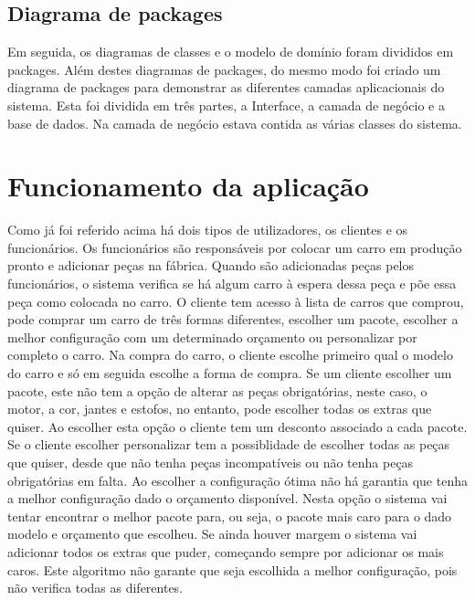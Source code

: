 \documentclass[10pt, a4paper]{article}
\begin{document}
\subsection{Diagrama de packages}
Em seguida, os diagramas de classes e o modelo de domínio foram divididos em packages. Além destes diagramas de packages, do mesmo modo foi criado um diagrama de packages para demonstrar as diferentes camadas aplicacionais do sistema. Esta foi dividida em três partes, a Interface, a camada de negócio e a base de dados. Na camada de negócio estava contida as várias classes do sistema.

\section{Funcionamento da aplicação}
Como já foi referido acima há dois tipos de utilizadores, os clientes e os funcionários. Os funcionários são responsáveis por colocar um carro em produção pronto e adicionar peças na fábrica. Quando são adicionadas peças pelos funcionários, o sistema verifica se há algum carro à espera dessa peça e põe essa peça como colocada no carro. O cliente tem acesso à lista de carros que comprou, pode comprar um carro de três formas diferentes, escolher um pacote, escolher a melhor configuração com um determinado orçamento ou personalizar por completo o carro. Na compra do carro, o cliente escolhe primeiro qual o modelo do carro e só em seguida escolhe a forma de compra. Se um cliente escolher um pacote, este não tem a opção de alterar as peças obrigatórias, neste caso, o motor, a cor, jantes e estofos, no entanto, pode escolher todas os extras que quiser. Ao escolher esta opção o cliente tem um desconto associado a cada pacote. Se o cliente escolher personalizar tem a possiblidade de escolher todas as peças que quiser, desde que não tenha peças incompatíveis ou não tenha peças obrigatórias em falta. Ao escolher a configuração ótima não há garantia que tenha a melhor configuração dado o orçamento disponível. Nesta opção o sistema vai tentar encontrar o melhor pacote para, ou seja, o pacote mais caro para o dado modelo e orçamento que escolheu. Se ainda houver margem o sistema vai adicionar todos os extras que puder, começando sempre por adicionar os mais caros. Este algoritmo não garante que seja escolhida a melhor configuração, pois não verifica todas as diferentes.

\newpage
\end{document}
